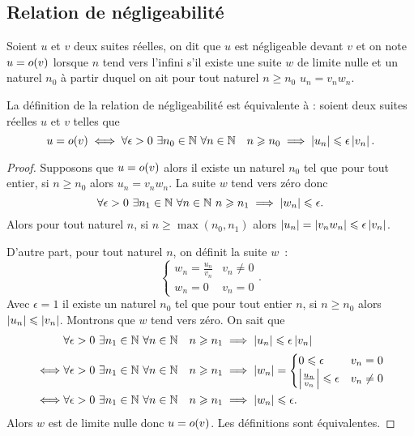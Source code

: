 \subsection{Relation de négligeabilité}

\begin{defdef}
  Soient \(u\) et \(v\) deux suites réelles, on dit que \(u\) est négligeable devant \(v\) et on note \(u = o\mathopen{}\left(v\right)\) lorsque \(n\) tend vers l'infini s'il existe une suite \(w\) de limite nulle et un naturel \(n_0\) à partir duquel on ait pour tout naturel \(n \geqslant n_0\) \(u_n = v_n w_n\).
\end{defdef}
\begin{prop}
  La définition de la relation de négligeabilité est équivalente à : soient deux suites réelles \(u\) et \(v\) telles que
  \begin{equation}
    u = o\mathopen{}\left(v\right) \iff \forall \epsilon > 0 \ \exists n_0 \in \mathbb{N} \ \forall n \in \mathbb{N} \quad n \geqslant n_0 \implies \left\lvert u_n\right\rvert \leqslant \epsilon \left\lvert v_n\right\rvert.
  \end{equation}
\end{prop}
\begin{proof}
  Supposons que \(u = o\mathopen{}\left(v\right)\) alors il existe un naturel \(n_0\) tel que pour tout entier, si \(n \geqslant n_0\) alors \(u_n = v_n w_n\). La suite \(w\) tend vers zéro donc
  \begin{equation}
    \forall \epsilon > 0 \ \exists n_1 \in \mathbb{N} \ \forall n \in \mathbb{N} \ n \geqslant n_1 \implies \left\lvert w_n\right\rvert \leqslant \epsilon.
  \end{equation}
  Alors pour tout naturel \(n\), si \(n \geqslant \max(n_0, n_1)\) alors \(\left\lvert u_n\right\rvert = \left\lvert v_n w_n\right\rvert \leqslant \epsilon \left\lvert v_n\right\rvert\).

  D'autre part, pour tout naturel \(n\), on définit la suite \(w\)~:
  \begin{equation}
    \begin{cases} w_n = \frac{u_n}{v_n} & v_n \neq 0 \\ w_n = 0 & v_n = 0\end{cases}.
  \end{equation}
  Avec \(\epsilon = 1\) il existe un naturel \(n_0\) tel que pour tout entier \(n\), si \(n \geqslant n_0\) alors \(\left\lvert u_n\right\rvert \leqslant \left\lvert v_n\right\rvert\). Montrons que \(w\) tend vers zéro. On sait que
  \begin{align}
    & \forall \epsilon > 0 \ \exists n_1 \in \mathbb{N} \ \forall n \in \mathbb{N} \quad n \geqslant n_1 \implies \left\lvert u_n\right\rvert \leqslant \epsilon \left\lvert v_n\right\rvert \\ 
    \iff & \forall \epsilon > 0 \ \exists n_1 \in \mathbb{N} \ \forall n \in \mathbb{N} \quad n \geqslant n_1 \implies \left\lvert w_n\right\rvert= \begin{cases} 0 \leqslant \epsilon & v_n = 0 \\ \left\lvert\frac{u_n}{v_n}\right\rvert \leqslant \epsilon & v_n\neq 0 \end{cases} \\
    \iff & \forall \epsilon > 0 \ \exists n_1 \in \mathbb{N} \ \forall n \in \mathbb{N} \quad n \geqslant n_1 \implies \left\lvert w_n\right\rvert \leqslant \epsilon.
  \end{align}
  Alors \(w\) est de limite nulle donc \(u = o\mathopen{}\left(v\right)\). Les définitions sont équivalentes.
\end{proof}
